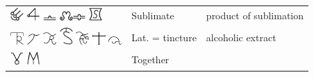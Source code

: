 \documentclass[british,final,landscape]{scrartcl}
\begin{document}
\begin{refsection}
\begin{supertabular}{p{0.3\textwidth}p{0.34\textwidth}p{0.34\textwidth}}
   \includegraphics[width=5mm]{Process/Sublimate} \includegraphics[width=5mm]{Process/Sublimate2} \includegraphics[width=5mm]{Process/Sublimate3} \includegraphics[width=5mm]{Process/Sublimate4}\includegraphics[width=5mm]{Process/Sublimate5} \includegraphics[width=5mm]{Process/Sublimate6} & Sublimate & product of sublimation \\
   \includegraphics[width=5mm]{Process/Tincture}  \includegraphics[width=5mm]{Process/Tincture2} \includegraphics[width=5mm]{Process/Tincture3} \includegraphics[width=5mm]{Process/Tincture4} \includegraphics[width=5mm]{Process/Tincture5} \includegraphics[width=5mm]{Process/Tincture6} \includegraphics[width=5mm]{Process/Tincture7} & Lat.  = tincture & alcoholic extract\\
   \includegraphics[width=5mm]{Process/Together} \includegraphics[width=5mm]{Process/Together2} & Together & \\

\end{supertabular}
\end{refsection}
\end{document}
